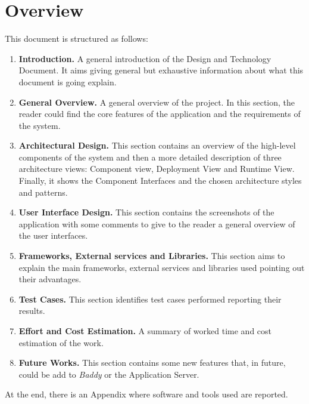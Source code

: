 \documentclass[../../dd.tex]{subfiles}
\begin{document}
    \section{Overview}
    This document is structured as follows:
    \begin{enumerate}
        \item \textbf{Introduction.} A general introduction of the Design and Technology Document.
        It aims giving general but exhaustive information
        about what this document is going explain.
        \item \textbf{General Overview.} A general overview of the project.
        In this section, the reader could find the core features of the application and
        the requirements of the system.
        \item \textbf{Architectural Design.} This section contains an overview
        of the high-level components of the system and then a more detailed
        description of three architecture views: Component view, Deployment
        View and Runtime View.
        Finally, it shows the Component Interfaces
        and the chosen architecture styles and patterns.
        \item \textbf{User Interface Design.} This section contains the screenshots
        of the application with some comments to give to the reader a general
        overview of the user interfaces.
        \item \textbf{Frameworks, External services and Libraries.} This section
        aims to explain the main frameworks, external services and libraries
        used pointing out their advantages.
        \item \textbf{Test Cases.} This section identifies test cases performed reporting
        their results.
        \item \textbf{Effort and Cost Estimation.} A summary of worked time and
        cost estimation of the work.
        \item \textbf{Future Works.} This section contains some new features that,
        in future, could be add to \textit{Baddy} or the Application Server.
    \end{enumerate}

    At the end, there is an Appendix where software and tools used are reported.
\end{document}
